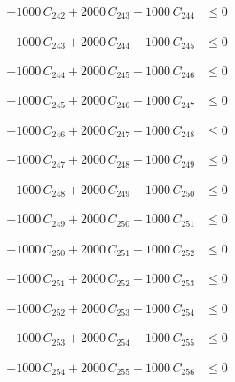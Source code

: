 \documentclass[a4paper,11pt]{article}
\begin{document}
\begin{align}
-1000\,C_{242} + 2000\,C_{243} - 1000\,C_{244} &\leq 0 \nonumber
\end{align}

\begin{align}
-1000\,C_{243} + 2000\,C_{244} - 1000\,C_{245} &\leq 0 \nonumber
\end{align}

\begin{align}
-1000\,C_{244} + 2000\,C_{245} - 1000\,C_{246} &\leq 0 \nonumber
\end{align}

\begin{align}
-1000\,C_{245} + 2000\,C_{246} - 1000\,C_{247} &\leq 0 \nonumber
\end{align}

\begin{align}
-1000\,C_{246} + 2000\,C_{247} - 1000\,C_{248} &\leq 0 \nonumber
\end{align}

\begin{align}
-1000\,C_{247} + 2000\,C_{248} - 1000\,C_{249} &\leq 0 \nonumber
\end{align}

\begin{align}
-1000\,C_{248} + 2000\,C_{249} - 1000\,C_{250} &\leq 0 \nonumber
\end{align}

\begin{align}
-1000\,C_{249} + 2000\,C_{250} - 1000\,C_{251} &\leq 0 \nonumber
\end{align}

\begin{align}
-1000\,C_{250} + 2000\,C_{251} - 1000\,C_{252} &\leq 0 \nonumber
\end{align}

\begin{align}
-1000\,C_{251} + 2000\,C_{252} - 1000\,C_{253} &\leq 0 \nonumber
\end{align}

\begin{align}
-1000\,C_{252} + 2000\,C_{253} - 1000\,C_{254} &\leq 0 \nonumber
\end{align}

\begin{align}
-1000\,C_{253} + 2000\,C_{254} - 1000\,C_{255} &\leq 0 \nonumber
\end{align}

\begin{align}
-1000\,C_{254} + 2000\,C_{255} - 1000\,C_{256} &\leq 0 \nonumber
\end{align}
\end{document}
